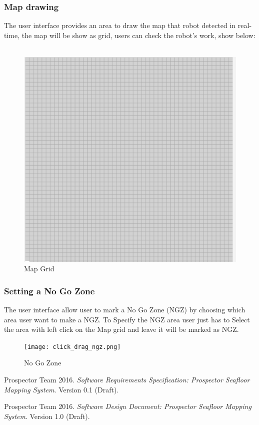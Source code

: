 \documentclass[12pt]{article}
\begin{document}
\subsubsection{Map drawing}
The user interface provides an area to draw the map that robot detected in real-time, the map will be show as grid, users can check the robot's work, show below:
\ 
\begin{figure}[H]
\includegraphics[width=\textwidth]{drawmap.png}
\caption{Map Grid}
  \label{fig:Map_grid}
\end{figure}

\subsubsection{Setting a No Go Zone }
The user interface allow user to mark a No Go Zone (NGZ) by choosing which area user want to make a NGZ. To Specify the NGZ area user just has to Select the area with left click on the Map grid and leave it will be marked as NGZ.
\begin{figure}[H]


\texttt{[image: click\_drag\_ngz.png]}
\caption{No Go Zone}
  \label{fig:No_go_zone}
\end{figure}




\begin{thebibliography}{1}


 Prospector Team 2016. \textit{Software Requirements Specification: Prospector Seafloor Mapping System}. Version 0.1 (Draft).

 Prospector Team 2016. \textit{Software Design Document: Prospector Seafloor Mapping System}. Version 1.0 (Draft).   

  \end{thebibliography}
\end{document}

